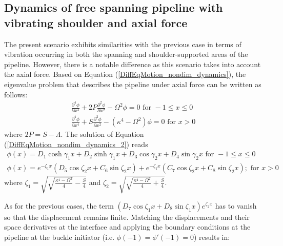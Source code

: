 \documentclass[3p,doublespacing,authoryear,11pt]{elsarticle} %
\begin{document}
\subsection{Dynamics of free spanning pipeline with vibrating shoulder and axial force}
The present scenario exhibits similarities with the previous case in terms of vibration occurring in both the spanning and shoulder-supported areas of the pipeline. However, there is a notable difference as this scenario takes into account the axial force. Based on Equation (\ref{DiffEqMotion_nondim_dynamics}), the eigenvalue problem that describes the pipeline under axial force can be written as follows:  
 \begin{equation}\label{DiffEqMotion_nondim_dynamics_2}
 \begin{array}{l } 
\displaystyle  \frac{\partial^4 \phi}{\partial x^4} + 2P  \frac{\partial^2 \phi}{\partial x^2}  - \Omega^2 \phi  =  0  \text{ for } -1 \le x \le 0 \\
\displaystyle  \frac{\partial^4 \phi}{\partial x^4}   + S  \frac{\partial^2 \phi}{\partial x^2} - (\kappa^4- \Omega^2) \phi  = 0 \text{ for } x > 0
  \end{array}  
\end{equation}
where $2P = S -\Lambda$. The solution of Equation (\ref{DiffEqMotion_nondim_dynamics_2}) reads 
 \begin{equation}\label{SolutionDiffEqMotion_nondim_dynamics_2}
 \begin{array}{l } 
\displaystyle  \phi (x)= D_1 \cosh \gamma_1 x + D_2 \sinh \gamma_1 x + D_3 \cos \gamma_2 x + D_4 \sin \gamma_2 x  \text{ for } -1 \le x \le 0 \\
\displaystyle  \phi (x)=  e^{-\zeta_1 x} \left(D_5 \cos \zeta_2 x +  C_6 \sin \zeta_2 x\right)  +  e^{-\zeta_1 x} \left(C_7 \cos \zeta_2 x +  C_8 \sin \zeta_2 x\right) ; \text{ for } x > 0
  \end{array}  
\end{equation}
where $\zeta_1 = \sqrt{\sqrt{\frac{\kappa^4 - \Omega^2}{4}} - \frac{S}{4}}$ and $\zeta_2 = \sqrt{\sqrt{\frac{\kappa^4 - \Omega^2}{4}} + \frac{S}{4}}$. 

As for the previous cases, the term $ \left(D_7 \cos \zeta_1 x +  D_8 \sin \zeta_1 x\right)e^{\zeta_2 x}$ has to vanish so that the displacement remains finite. Matching the displacements and their space derivatives at the interface and applying the boundary conditions at the pipeline at the buckle initiator (i.e. $ \phi (-1) = \phi' (-1) =0$) results in: 
\end{document}
